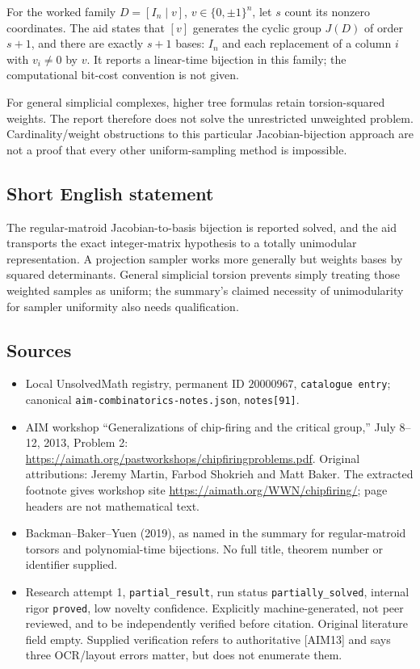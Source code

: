 \documentclass[11pt]{article}
\begin{document}
For the worked family $D=[I_n\mid v]$, $v\in\{0,\pm1\}^n$, let $s$ count its nonzero coordinates. The aid states that $[v]$ generates the cyclic group $J(D)$ of order $s+1$, and there are exactly $s+1$ bases: $I_n$ and each replacement of a column $i$ with $v_i\ne0$ by $v$. It reports a linear-time bijection in this family; the computational bit-cost convention is not given.

For general simplicial complexes, higher tree formulas retain torsion-squared weights. The report therefore does not solve the unrestricted unweighted problem. Cardinality/weight obstructions to this particular Jacobian-bijection approach are not a proof that every other uniform-sampling method is impossible.
\subsection{Short English statement}
The regular-matroid Jacobian-to-basis bijection is reported solved, and the aid transports the exact integer-matrix hypothesis to a totally unimodular representation. A projection sampler works more generally but weights bases by squared determinants. General simplicial torsion prevents simply treating those weighted samples as uniform; the summary's claimed necessity of unimodularity for sampler uniformity also needs qualification.
\subsection{Sources}
\begin{itemize}
\item Local UnsolvedMath registry, permanent ID $20000967$, \texttt{catalogue entry}; canonical \texttt{aim-combinatorics-notes.json}, \texttt{notes[91]}.
\item AIM workshop ``Generalizations of chip-firing and the critical group,'' July 8--12, 2013, Problem 2: \url{https://aimath.org/pastworkshops/chipfiringproblems.pdf}. Original attributions: Jeremy Martin, Farbod Shokrieh and Matt Baker. The extracted footnote gives workshop site \url{https://aimath.org/WWN/chipfiring/}; page headers are not mathematical text.
\item Backman--Baker--Yuen (2019), as named in the summary for regular-matroid torsors and polynomial-time bijections. No full title, theorem number or identifier supplied.
\item Research attempt 1, \texttt{partial\_result}, run status \texttt{partially\_solved}, internal rigor \texttt{proved}, low novelty confidence. Explicitly machine-generated, not peer reviewed, and to be independently verified before citation. Original literature field empty. Supplied verification refers to authoritative [AIM13] and says three OCR/layout errors matter, but does not enumerate them.
\end{itemize}
\end{document}
